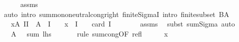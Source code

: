 \begin{isabellebody}
\ \ \ \ \isamarkupfalse%
\ assms\isanewline
\ \ \ \ \isamarkupfalse%
\ {\isacharparenleft}{\kern0pt}auto\ intro{\isacharbang}{\kern0pt}{\isacharcolon}{\kern0pt}\ sum{\isachardot}{\kern0pt}mono{\isacharunderscore}{\kern0pt}neutral{\isacharunderscore}{\kern0pt}cong{\isacharunderscore}{\kern0pt}right\ finite{\isacharunderscore}{\kern0pt}SigmaI{}\ intro{\isacharcolon}{\kern0pt}\ finite{\isacharunderscore}{\kern0pt}subset{\isacharbrackleft}{\kern0pt}\ B{\isacharequal}{\kern0pt}{\isachardoublequoteopen}{\isasymUnion}A{\isachardoublequoteclose}{\isacharbrackright}{\kern0pt}{\isacharparenright}{\kern0pt}\isanewline
\ \ \isamarkupfalse%
\ \isamarkupfalse%
\ {\isachardoublequoteopen}{\isasymdots}\ {\isacharequal}{\kern0pt}\ {\isacharparenleft}{\kern0pt}{\isasymSum}x{\isasymin}{\isasymUnion}A{\isachardot}{\kern0pt}\ {\isacharparenleft}{\kern0pt}{\isasymSum}I{\isacharbar}{\kern0pt}I\ {\isasymsubseteq}\ A\ {\isasymand}\ I\ {\isasymnoteq}\ {\isacharbraceleft}{\kern0pt}{\isacharbraceright}{\kern0pt}\ {\isasymand}\ x\ {\isasymin}\ {\isasymInter}I{\isachardot}{\kern0pt}\ {\isacharparenleft}{\kern0pt}{\isacharminus}{\kern0pt}\ {}{\isacharparenright}{\kern0pt}\ {\isacharcircum}{\kern0pt}\ {\isacharparenleft}{\kern0pt}card\ I\ {\isacharplus}{\kern0pt}\ {}{\isacharparenright}{\kern0pt}{\isacharparenright}{\kern0pt}{\isacharparenright}{\kern0pt}{\isachardoublequoteclose}\isanewline
\ \ \ \ \isamarkupfalse%
\ assms\ \isamarkupfalse%
\ {\isacharparenleft}{\kern0pt}subst\ sum{\isachardot}{\kern0pt}Sigma{\isacharparenright}{\kern0pt}\ auto\isanewline
\ \ \isamarkupfalse%
\ \isamarkupfalse%
\ {\isachardoublequoteopen}{\isasymdots}\ {\isacharequal}{\kern0pt}\ {\isacharparenleft}{\kern0pt}{\isasymSum}{\isacharunderscore}{\kern0pt}{\isasymin}{\isasymUnion}A{\isachardot}{\kern0pt}\ {}{\isacharparenright}{\kern0pt}{\isachardoublequoteclose}\ {\isacharparenleft}{\kern0pt}\ {\isachardoublequoteopen}sum\ {\isacharquery}{\kern0pt}lhs\ {\isacharunderscore}{\kern0pt}\ {\isacharequal}{\kern0pt}\ {\isacharunderscore}{\kern0pt}{\isachardoublequoteclose}{\isacharparenright}{\kern0pt}\isanewline
\ \ \isamarkupfalse%
\ {\isacharparenleft}{\kern0pt}rule\ sum{\isachardot}{\kern0pt}cong{\isacharbrackleft}{\kern0pt}OF\ refl{\isacharbrackright}{\kern0pt}{\isacharparenright}{\kern0pt}\isanewline
\ \ \ \ \isamarkupfalse%
\ x\isanewline
\ \ \ \ \isamarkupfalse%

\end{isabellebody}
